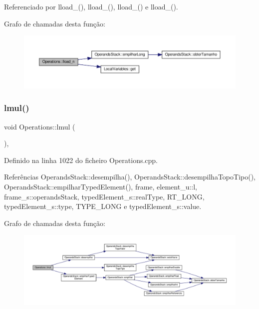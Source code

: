 Referenciado por lload\+\_(), lload\+\_(), lload\+\_() e lload\+\_().

Grafo de chamadas desta função\+:\nopagebreak
\begin{figure}[H]
\begin{center}
\leavevmode
\includegraphics[width=350pt]{classOperations_a4f70442aed776d9ccae4dfd379715cd4_cgraph}
\end{center}
\end{figure}
\mbox{\label{classOperations_ae23a8dfdcc02432b6f880334fa4a7c59}} 
\subsubsection{\texorpdfstring{lmul()}{lmul()}}
{\footnotesize\ttfamily void Operations\+::lmul (\begin{DoxyParamCaption}{ }\end{DoxyParamCaption})\hspace{0.3cm}{\ttfamily [static]}, {\ttfamily [private]}}



Definido na linha 1022 do ficheiro Operations.\+cpp.



Referências Operands\+Stack\+::desempilha(), Operands\+Stack\+::desempilha\+Topo\+Tipo(), Operands\+Stack\+::empilhar\+Typed\+Element(), frame, element\+\_\+u\+::l, frame\+\_\+s\+::operands\+Stack, typed\+Element\+\_\+s\+::real\+Type, R\+T\+\_\+\+L\+O\+NG, typed\+Element\+\_\+s\+::type, T\+Y\+P\+E\+\_\+\+L\+O\+NG e typed\+Element\+\_\+s\+::value.

Grafo de chamadas desta função\+:\nopagebreak
\begin{figure}[H]
\begin{center}
\leavevmode
\includegraphics[width=350pt]{classOperations_ae23a8dfdcc02432b6f880334fa4a7c59_cgraph}
\end{center}
\end{figure}
\mbox{\label{classOperations_a0a14cc7ee880b5d5f1c3b532e8e2117c}} 
